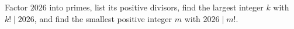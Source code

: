 Factor $2026$ into primes, list its positive divisors, find the largest integer $k$ with $k!\mid2026$, and find the smallest positive integer $m$ with $2026\mid m!$.
